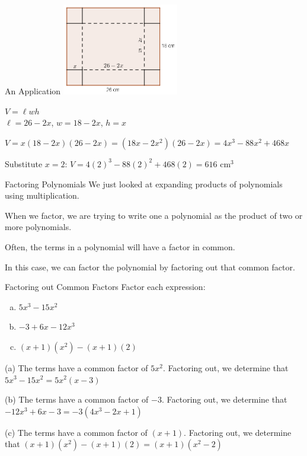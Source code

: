 \documentclass{beamer}
\newcommand{\fp}[1]{\left({#1}\right)} %
\begin{document}
\begin{frame}[t]{An Application}
\includegraphics[width=2in]{TakeOutBox.png}

$V = \ell w h$ \\ \pause
$\ell = 26 - 2x$, $w = 18-2x$, $h = x$ \pause

$V = x(18-2x)(26-2x) = (18x - 2x^2)(26 - 2x) = 4x^3 - 88x^2 + 468x$ \pause

Substitute $x = 2$: $V = 4(2)^3 - 88(2)^2 + 468(2) = 616 \text{ cm}^3$
\end{frame}

\begin{frame}[t]{Factoring Polynomials}
We just looked at expanding products of polynomials using multiplication.

When we factor, we are trying to write one a polynomial as the product of two or more polynomials.

Often, the terms in a polynomial will have a factor in common.

In this case, we can factor the polynomial by factoring out that common factor.
\end{frame}

\begin{frame}[t]{Factoring out Common Factors}
Factor each expression: \begin{enumerate}[(a)]
\item $5x^3 - 15x^2$
\item $-3 + 6x - 12x^3$
\item $(x+1)\fp{x^2} - (x+1)(2)$
\end{enumerate}

\pause

(a) The terms have a common factor of $5x^2$. Factoring out, we determine that
$5x^3 - 15x^2 = 5x^2\fp{x - 3}$ \pause

(b) The terms have a common factor of $-3$. Factoring out, we determine that $-12x^3 + 6x - 3 = -3\fp{4x^3 - 2x + 1}$ \pause

(c) The terms have a common factor of $(x+1)$. Factoring out, we determine that $(x+1)\fp{x^2} - (x+1)(2) = (x+1)\fp{x^2 - 2}$
\end{frame}
\end{document}
